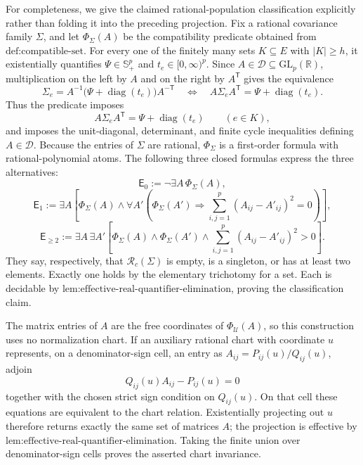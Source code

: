 For completeness, we give the claimed rational-population classification explicitly rather than folding it into the preceding projection. Fix a rational covariance family \(\Sigma\), and let \(\Phi_\Sigma(A)\) be the compatibility predicate obtained from \(\text{def:compatible-set}\). For every one of the finitely many sets \(K\subseteq E\) with \(|K|\geq h\), it existentially quantifies \(\Psi\in\mathbb S_+^p\) and \(t_e\in[0,\infty)^p\). Since \(A\in\mathcal D\subseteq\mathrm{GL}_p(\mathbb R)\), multiplication on the left by \(A\) and on the right by \(A^{\mathsf T}\) gives the equivalence
\[
\Sigma_e=A^{-1}\bigl(\Psi+\operatorname{diag}(t_e)\bigr)A^{-\mathsf T}
\quad\Longleftrightarrow\quad
A\Sigma_eA^{\mathsf T}=\Psi+\operatorname{diag}(t_e).
\]
Thus the predicate imposes
\[
A\Sigma_eA^{\mathsf T}=\Psi+\operatorname{diag}(t_e)
\qquad(e\in K),
\]
and imposes the unit-diagonal, determinant, and finite cycle inequalities defining \(A\in\mathcal D\). Because the entries of \(\Sigma\) are rational, \(\Phi_\Sigma\) is a first-order formula with rational-polynomial atoms. The following three closed formulas express the three alternatives:
\[
\mathsf E_0:=\neg\exists A\,\Phi_\Sigma(A),
\]
\[
\mathsf E_1:=\exists A\left[\Phi_\Sigma(A)\wedge
\forall A'\left(\Phi_\Sigma(A')\Rightarrow
\sum_{i,j=1}^p(A_{ij}-A'_{ij})^2=0\right)\right],
\]
\[
\mathsf E_{\geq2}:=\exists A\,\exists A'\left[
\Phi_\Sigma(A)\wedge\Phi_\Sigma(A')\wedge
\sum_{i,j=1}^p(A_{ij}-A'_{ij})^2>0\right].
\]
They say, respectively, that \(\mathcal R_c(\Sigma)\) is empty, is a singleton, or has at least two elements. Exactly one holds by the elementary trichotomy for a set. Each is decidable by \(\text{lem:effective-real-quantifier-elimination}\), proving the classification claim.

The matrix entries of \(A\) are the free coordinates of \(\Phi_{\mathcal U}(A)\), so this construction uses no normalization chart. If an auxiliary rational chart with coordinate \(u\) represents, on a denominator-sign cell, an entry as \(A_{ij}=P_{ij}(u)/Q_{ij}(u)\), adjoin
\[
Q_{ij}(u)A_{ij}-P_{ij}(u)=0
\]
together with the chosen strict sign condition on \(Q_{ij}(u)\). On that cell these equations are equivalent to the chart relation. Existentially projecting out \(u\) therefore returns exactly the same set of matrices \(A\); the projection is effective by \(\text{lem:effective-real-quantifier-elimination}\). Taking the finite union over denominator-sign cells proves the asserted chart invariance.

